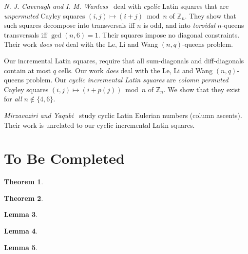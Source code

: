 \documentclass[10pt,a4paper]{article}
\newtheorem{theorem}{Theorem}[section]
\newtheorem{lemma}[theorem]{Lemma}
\theoremstyle{remark}
\begin{document}
\emph{N. J. Cavenagh and I. M. Wanless}~\cite{CW2010} deal with \emph{cyclic} Latin squares that are
\emph{unpermuted} Cayley squares $(i, j) \mapsto (i + j) \bmod n$ of $\mathbb{Z}_n$. They show that 
such squares decompose into transversals iff $n$ is odd, and into \emph{toroidal} $n$-queens
transversals iff $\gcd(n,6) = 1$. Their squares impose no diagonal constraints. Their work
\emph{does not} deal with the Le, Li and Wang $(n,q)$-queens problem.

Our incremental Latin squares, require that all sum-diagonals and diff-diagonals contain at most $q$
cells. Our work \emph{does} deal with the Le, Li and Wang $(n,q)$-queens problem. Our
\emph{cyclic incremental Latin squares} are \emph{colomn permuted} Cayley squares
$(i, j) \mapsto (i + p(j)) \bmod n$ of $\mathbb{Z}_n$. We show that they exist for \emph{all}
$n \notin \{4, 6\}$.

\emph{Mirzavaziri and Yaqubi}~\cite{MY2026} study cyclic Latin Eulerian numbers (column ascents).
Their work is unrelated to our cyclic incremental Latin squares.

\newpage

\section{To Be Completed}

\begin{theorem}\label{thm:main1}
\end{theorem}

\begin{theorem}\label{thm:main2}
\end{theorem}

\begin{lemma}\label{lem:small}
\end{lemma}

\begin{lemma}\label{lem:L4L6}
\end{lemma}

\begin{lemma}\label{lem:inj-maj}
\end{lemma}

\newpage


\end{document}
